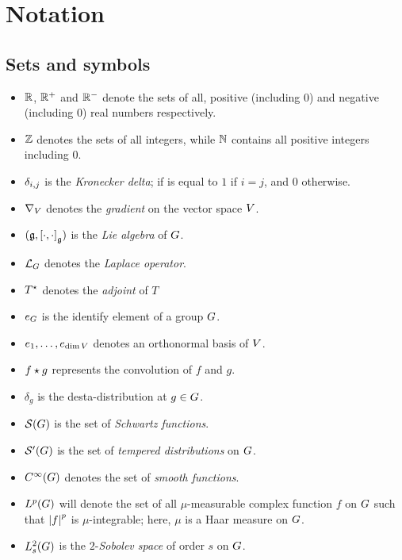 \chapter*{Notation}

\section*{Sets and symbols}

\begin{itemize}
    \item $\mathbb{R}$, $\mathbb{R}^+$ and $\mathbb{R}^-$ denote the sets of all, positive (including $0$) and negative (including $0$) real numbers respectively.
    \item $\mathbb{Z}$ denotes the sets of all integers,
        while $\mathbb{N}$ contains all positive integers including $0$.
    \item $\delta_{i,j}$ is the \emph{Kronecker delta};
        if is equal to $1$ if $i = j$,
        and $0$ otherwise.
    \item $\nabla_{V}$ denotes the \emph{gradient} on the vector space $V$.
    \item $(\mathfrak{g}, {[\cdot, \cdot]}_{\mathfrak{g}})$ is the \emph{Lie algebra} of $G$.
    \item ${\mathcal{L}_{G}}$ denotes the \emph{Laplace operator}.
    \item ${T}^\star$ denotes the \emph{adjoint} of $T$
    \item $e_G$ is the identify element of a group $G$.
    \item $e_1, \dots, e_{\dim V}$ denotes an orthonormal basis of $V$.
    \item $f \star g$ represents the convolution of $f$ and $g$.
    \item $\delta_g$ is the desta-distribution at $g \in G$.
    \item ${\mathcal{S} (G)}$ is the set of \emph{Schwartz functions}.
    \item ${\mathcal{S}' (G)}$ is the set of \emph{tempered distributions} on $G$.
    \item ${C^\infty(G)}$ denotes the set of \emph{smooth functions}.
    \item ${L^{p} (G)}$ will denote the set of all $\mu$-measurable complex function $f$ on $G$ such that $\left|{f}\right|^p$ is $\mu$-integrable;
        here, $\mu$ is a Haar measure on $G$.
    \item $L^2_{s}(G)$ is the $2$-\emph{Sobolev space} of order $s$ on $G$.

\end{itemize}
